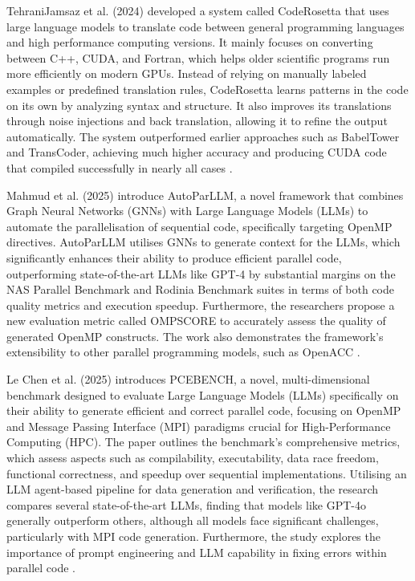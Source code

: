 \documentclass[conference]{IEEEtran}
\begin{document}
TehraniJamsaz et al. (2024) developed a system called CodeRosetta that uses large language models to translate code between general programming languages and high performance computing versions. It mainly focuses on converting between C++, CUDA, and Fortran, which helps older scientific programs run more efficiently on modern GPUs. Instead of relying on manually labeled examples or predefined translation rules, CodeRosetta learns patterns in the code on its own by analyzing syntax and structure. It also improves its translations through noise injections and back translation, allowing it to refine the output automatically. The system outperformed earlier approaches such as BabelTower and TransCoder, achieving much higher accuracy and producing CUDA code that compiled successfully in nearly all cases \cite{tehranijamsaz2024coderosettapushingboundariesunsupervised}. 

Mahmud et al. (2025) introduce AutoParLLM, a novel framework that combines Graph Neural Networks (GNNs) with Large Language Models (LLMs) to automate the parallelisation of sequential code, specifically targeting OpenMP directives. AutoParLLM utilises GNNs to generate context for the LLMs, which significantly enhances their ability to produce efficient parallel code, outperforming state-of-the-art LLMs like GPT-4 by substantial margins on the NAS Parallel Benchmark and Rodinia Benchmark suites in terms of both code quality metrics and execution speedup. Furthermore, the researchers propose a new evaluation metric called OMPSCORE to accurately assess the quality of generated OpenMP constructs. The work also demonstrates the framework's extensibility to other parallel programming models, such as OpenACC \cite{mahmud2025}.

Le Chen et al. (2025) introduces PCEBENCH, a novel, multi-dimensional benchmark designed to evaluate Large Language Models (LLMs) specifically on their ability to generate efficient and correct parallel code, focusing on OpenMP and Message Passing Interface (MPI) paradigms crucial for High-Performance Computing (HPC). The paper outlines the benchmark's comprehensive metrics, which assess aspects such as compilability, executability, data race freedom, functional correctness, and speedup over sequential implementations. Utilising an LLM agent-based pipeline for data generation and verification, the research compares several state-of-the-art LLMs, finding that models like GPT-4o generally outperform others, although all models face significant challenges, particularly with MPI code generation. Furthermore, the study explores the importance of prompt engineering and LLM capability in fixing errors within parallel code \cite{lechen2025}.
\end{document}
